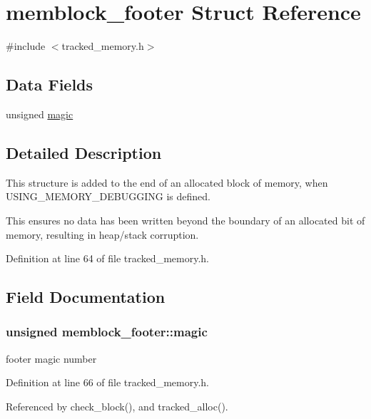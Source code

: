 \section{memblock\-\_\-footer Struct Reference}
\label{structmemblock__footer}


{\ttfamily \#include $<$tracked\-\_\-memory.\-h$>$}

\subsection*{Data Fields}
\begin{DoxyCompactItemize}
\item 
unsigned \hyperlink{structmemblock__footer_adbe248bf9ad8f03cdc7c202140989da9}{magic}
\end{DoxyCompactItemize}


\subsection{Detailed Description}
This structure is added to the end of an allocated block of memory, when U\-S\-I\-N\-G\-\_\-\-M\-E\-M\-O\-R\-Y\-\_\-\-D\-E\-B\-U\-G\-G\-I\-N\-G is defined.

This ensures no data has been written beyond the boundary of an allocated bit of memory, resulting in heap/stack corruption. 

Definition at line 64 of file tracked\-\_\-memory.\-h.



\subsection{Field Documentation}
\subsubsection[{magic}]{\setlength{\rightskip}{0pt plus 5cm}unsigned memblock\-\_\-footer\-::magic}\label{structmemblock__footer_adbe248bf9ad8f03cdc7c202140989da9}
footer magic number 

Definition at line 66 of file tracked\-\_\-memory.\-h.



Referenced by check\-\_\-block(), and tracked\-\_\-alloc().

